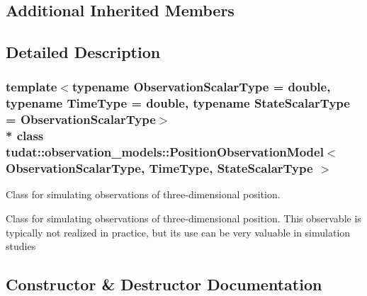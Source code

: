 \subsection*{Additional Inherited Members}


\subsection{Detailed Description}
\subsubsection*{template$<$typename Observation\+Scalar\+Type = double, typename Time\+Type = double, typename State\+Scalar\+Type = Observation\+Scalar\+Type$>$\\*
class tudat\+::observation\+\_\+models\+::\+Position\+Observation\+Model$<$ Observation\+Scalar\+Type, Time\+Type, State\+Scalar\+Type $>$}

Class for simulating observations of three-\/dimensional position. 

Class for simulating observations of three-\/dimensional position. This observable is typically not realized in practice, but its use can be very valuable in simulation studies 

\subsection{Constructor \& Destructor Documentation}
